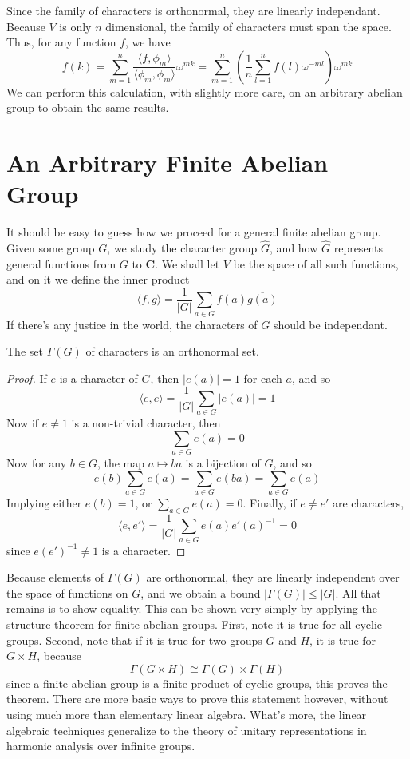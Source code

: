 Since the family of characters is orthonormal, they are linearly independant. Because $V$ is only $n$ dimensional, the family of characters must span the space. Thus, for any function $f$, we have
%
\[ f(k) = \sum_{m = 1}^n \frac{\langle f, \phi_m \rangle}{\langle \phi_m, \phi_m \rangle} \omega^{mk} = \sum_{m = 1}^n \left( \frac{1}{n} \sum_{l = 1}^n f(l) \omega^{-ml} \right) \omega^{mk} \]
%
We can perform this calculation, with slightly more care, on an arbitrary abelian group to obtain the same results.

\section{An Arbitrary Finite Abelian Group}

It should be easy to guess how we proceed for a general finite abelian group. Given some group $G$, we study the character group $\hat{G}$, and how $\hat{G}$ represents general functions from $G$ to $\mathbf{C}$. We shall let $V$ be the space of all such functions, and on it we define the inner product
%
\[ \langle f, g \rangle = \frac{1}{|G|} \sum_{a \in G} f(a) \overline{g(a)} \]
%
If there's any justice in the world, the characters of $G$ should be independant.

\begin{theorem}
    The set $\Gamma(G)$ of characters is an orthonormal set.
\end{theorem}
\begin{proof}
    If $e$ is a character of $G$, then $|e(a)| = 1$ for each $a$, and so
    \[ \langle e, e \rangle = \frac{1}{|G|} \sum_{a \in G} |e(a)| = 1 \]
    Now if $e \neq 1$ is a non-trivial character, then
    \[ \sum_{a \in G} e(a) = 0 \]
    Now for any $b \in G$, the map $a \mapsto ba$ is a bijection of $G$, and so
    \[ e(b) \sum_{a \in G} e(a) = \sum_{a \in G} e(ba) = \sum_{a \in G} e(a) \]
    Implying either $e(b) = 1$, or $\sum_{a \in G} e(a) = 0$. Finally, if $e \neq e'$ are characters,
    \[ \langle e, e' \rangle = \frac{1}{|G|} \sum_{a \in G} e(a) e'(a)^{-1} = 0 \]
    since $e(e')^{-1} \neq 1$ is a character.
\end{proof}

Because elements of $\Gamma(G)$ are orthonormal, they are linearly independent over the space of functions on $G$, and we obtain a bound $|\Gamma(G)| \leq |G|$. All that remains is to show equality. This can be shown very simply by applying the structure theorem for finite abelian groups. First, note it is true for all cyclic groups. Second, note that if it is true for two groups $G$ and $H$, it is true for $G \times H$, because
%
\[ \Gamma(G \times H) \cong \Gamma(G) \times \Gamma(H) \]
%
since a finite abelian group is a finite product of cyclic groups, this proves the theorem. There are more basic ways to prove this statement however, without using much more than elementary linear algebra. What's more, the linear algebraic techniques generalize to the theory of unitary representations in harmonic analysis over infinite groups.

